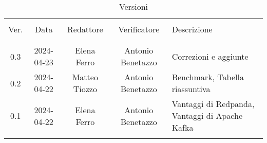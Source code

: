 \documentclass[italian,12pt]{article}
\begin{document}

\newpage


\begin{table}[!h]
	\caption*{Versioni}
	\begin{center}
		\begin{tabular}{ c c c c p{6.1cm} }
			\hline                                                                                                 \\[-2ex]
			Ver. & Data       & Redattore     & Verificatore      & Descrizione                                    \\
			\\[-2ex] \hline \\[-1.5ex]
			0.3  & 2024-04-23 & Elena Ferro   & Antonio Benetazzo & Correzioni e aggiunte                          \\
			0.2  & 2024-04-22 & Matteo Tiozzo & Antonio Benetazzo & Benchmark, Tabella riassuntiva                 \\
			0.1  & 2024-04-22 & Elena Ferro   & Antonio Benetazzo & Vantaggi di Redpanda, Vantaggi di Apache Kafka \\
			\\[-1.5ex] \hline
		\end{tabular}
	\end{center}
\end{table}

\newpage
\tableofcontents
\listoftables
\listoffigures
\newpage










\end{document}
